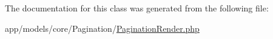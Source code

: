 The documentation for this class was generated from the following file\-:\begin{DoxyCompactItemize}
\item 
app/models/core/\-Pagination/\hyperlink{_pagination_render_8php}{Pagination\-Render.\-php}\end{DoxyCompactItemize}
